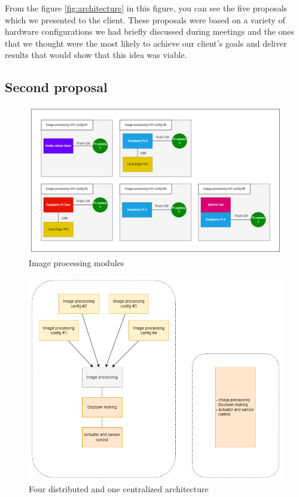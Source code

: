 From the figure \ref{fig:architecture} in this figure, you can see the five proposals which we presented to the client. These proposals were based on a variety of hardware configurations we had briefly discussed during meetings and the ones that we thought were the most likely to achieve our client's goals and deliver results that would show that this idea was viable. \\

\subsection{Second proposal}


\begin{figure}[H]
    \centering
    \includegraphics[scale=0.5]{a_martinbilder/hw_proposal2.drawio.png}
    \caption{Image processing modules}
    \label{fig:image_processing_prop2}
\end{figure}

\begin{figure}[H]
    \centering
    \includegraphics[scale=0.5]{fig/DistributedVsCentralized.png}
    \caption{Four distributed and one centralized architecture}
    \label{fig:distributed_vs_centralized}
\end{figure}

